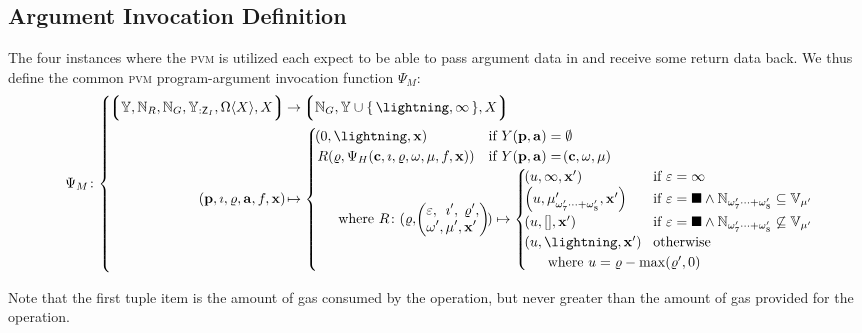 \subsection{Argument Invocation Definition}

The four instances where the \textsc{pvm} is utilized each expect to be able to pass argument data in and receive some return data back. We thus define the common \textsc{pvm} program-argument invocation function $\Psi_M$:
\begin{equation}
  \Psi_M\colon \abracegroup{
    \tuple{
      \blob, \pvmreg, \gas, \bloboflen{:\mathsf{Z}_I}, \Omega\ang{X}, X
    } &\to \tuple{\gas, \blob \cup \set{\panic, \oog}, X}\\
    \tup{\mathbf{p}, \imath, \gascounter, \mathbf{a}, f, \mathbf{x}} &\mapsto \begin{cases}
      \tup{0, \panic, \mathbf{x}} &\when Y(\mathbf{p}, \mathbf{a}) = \none\\
      R(\gascounter, \Psi_H(\mathbf{c}, \imath, \gascounter, \registers, \mem, f, \mathbf{x})) &\when Y(\mathbf{p}, \mathbf{a}) = \tup{\mathbf{c}, \registers, \mem}\\
      \multicolumn{2}{l}{
        \quad \where R \colon (\gascounter, \tup{\begin{alignedat}{5}
          &\varepsilon,\, &&\imath',\, &&\gascounter',\\
          &\registers',\, &&\mem',\, &&\mathbf{x}'
        \end{alignedat}
        }) \mapsto \begin{cases}
          \tup{u, \oog, \mathbf{x}'} &\when \varepsilon = \oog \\
          \tup{u, \memory'_{\registers'_{7}\dots+\registers'_{8}}, \mathbf{x}'} &\when \varepsilon = \halt \wedge \Nrange{\registers'_{7}}{\registers'_{8}} \subseteq \readable{\mem'} \\
          \tup{u, [], \mathbf{x}'} &\when \varepsilon = \halt \wedge \Nrange{\registers'_{7}}{\registers'_{8}} \not\subseteq \readable{\mem'} \\
          \tup{u, \panic, \mathbf{x}'} &\otherwise \\
          \multicolumn{2}{l}{\quad \where u = \gascounter - \max(\gascounter', 0)}
        \end{cases}
      }\!\!\!\!\!\!\!\!
    \end{cases}
  }
\end{equation}

Note that the first tuple item is the amount of gas consumed by the operation, but never greater than the amount of gas provided for the operation.
